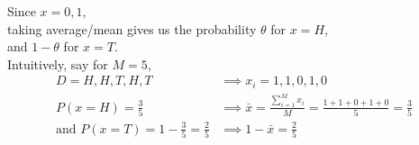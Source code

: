 \documentclass{article}%
\begin{document}
\begin{enumerate}
\begin{enumerate}
Since $x = 0,1$,\\
taking average/mean gives us the probability $\theta$ for $x=H$,\\
and \hspace{5.5cm} $1-\theta$ for $x=T$. \\

Intuitively, say for $M=5$,
\begin{align*}
D = H,H,T,H,T & \implies x_i = 1,1,0,1,0\\
P(x=H) = \frac{3}{5} & \implies \bar{x} = \frac{\sum_{i=1}^M{x_i}}{M} = \frac{1+1+0+1+0}{5} = \frac{3}{5} \\
\text{and } P(x=T) = 1-\frac{3}{5} = \frac{2}{5} & \implies 1-\bar{x} = \frac{2}{5}
\end{align*}
\end{enumerate}

\end{enumerate}
\end{document}
